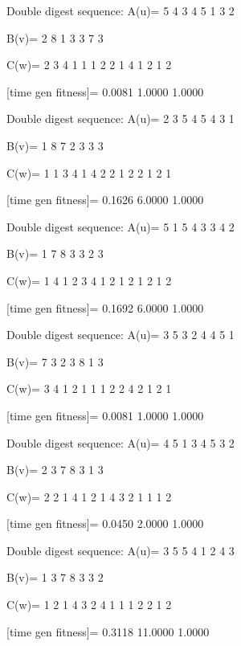 Double digest sequence:
A(u)=
     5     4     3     4     5     1     3     2

B(v)=
     2     8     1     3     3     7     3

C(w)=
     2     3     4     1     1     1     2     2     1     4     1     2     1     2

[time gen fitness]=
    0.0081    1.0000    1.0000

Double digest sequence:
A(u)=
     2     3     5     4     5     4     3     1

B(v)=
     1     8     7     2     3     3     3

C(w)=
     1     1     3     4     1     4     2     2     1     2     2     1     2     1

[time gen fitness]=
    0.1626    6.0000    1.0000

Double digest sequence:
A(u)=
     5     1     5     4     3     3     4     2

B(v)=
     1     7     8     3     3     2     3

C(w)=
     1     4     1     2     3     4     1     2     1     2     1     2     1     2

[time gen fitness]=
    0.1692    6.0000    1.0000

Double digest sequence:
A(u)=
     3     5     3     2     4     4     5     1

B(v)=
     7     3     2     3     8     1     3

C(w)=
     3     4     1     2     1     1     1     2     2     4     2     1     2     1

[time gen fitness]=
    0.0081    1.0000    1.0000

Double digest sequence:
A(u)=
     4     5     1     3     4     5     3     2

B(v)=
     2     3     7     8     3     1     3

C(w)=
     2     2     1     4     1     2     1     4     3     2     1     1     1     2

[time gen fitness]=
    0.0450    2.0000    1.0000

Double digest sequence:
A(u)=
     3     5     5     4     1     2     4     3

B(v)=
     1     3     7     8     3     3     2

C(w)=
     1     2     1     4     3     2     4     1     1     1     2     2     1     2

[time gen fitness]=
    0.3118   11.0000    1.0000

